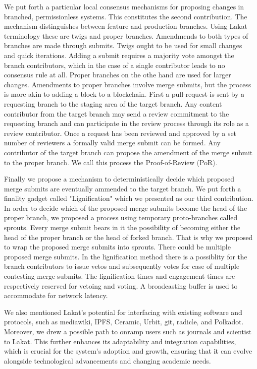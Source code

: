 We put forth a particular local consensus mechanisms for proposing changes in branched, permissionless systems. This constitutes the second contribution. The mechanism distinguishes between feature and production branches. Using Lakat terminology these are twigs and proper branches. Amendmends to both types of branches are made through submits. Twigs ought to be used for small changes and quick iterations. Adding a submit requires a majority vote amongst the branch contributors, which in the case of a single contributor leads to no consensus rule at all. Proper branches on the othe hand are used for larger changes. Amendments to proper branches involve merge submits, but the process is more akin to adding a block to a blockchain. First a pull-request is sent by a requesting branch to the staging area of the target branch. Any content contributor from the target branch may send a review commitment to the requesting branch and can participate in the review process through its role as a review contributor. Once a request has been reviewed and approved by a set number of reviewers a formally valid merge submit can be formed. Any contributor of the target branch can propose the amendment of the merge submit to the proper branch. We call this process the Proof-of-Review (PoR).

Finally we propose a mechanism to deterministically decide which proposed merge submits are eventually ammended to the target branch. We put forth a finality gadget called "Lignification" which we presented as our third contribution. In order to decide which of the proposed merge submits become the head of the proper branch, we proposed a process using temporary proto-branches called sprouts. Every merge submit bears in it the possibility of becoming either the head of the proper branch or the head of forked branch. That is why we proposed to wrap the proposed merge submits into sprouts. There could be multiple proposed merge submits. In the lignification method there is a possiblity for the branch contributors to issue vetos and subsequently votes for case of multiple contesting merge submits. The lignification times and engagement times are respectively reserved for vetoing and voting. A broadcasting buffer is used to accommodate for network latency. 

We also mentioned Lakat's potential for interfacing with existing software and protocols, such as mediawiki, IPFS, Ceramic, Urbit, git, radicle, and Polkadot. Moreover, we drew a possible path to onramp users such as journals and scientist to Lakat. This further enhances its adaptability and integration capabilities, which is crucial for the system's adoption and growth, ensuring that it can evolve alongside technological advancements and changing academic needs.

